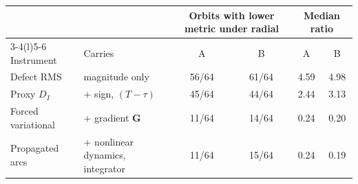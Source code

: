 \begin{tabular}{@{}l l cc cc@{}}
\toprule
 & & \multicolumn{2}{c}{Orbits with lower metric under radial} & \multicolumn{2}{c}{Median ratio} \\
\cmidrule(lr){3-4}\cmidrule(l){5-6}
Instrument & Carries & A & B & A & B \\
\midrule
Defect RMS & magnitude only & 56/64 & 61/64 & 4.59 & 4.98 \\
Proxy $D_I$ & $+$ sign, $(T-\tau)$ & 45/64 & 44/64 & 2.44 & 3.13 \\
Forced variational & $+$ gradient $\mathbf G$ & 11/64 & 14/64 & 0.24 & 0.20 \\
Propagated arcs & $+$ nonlinear dynamics, integrator & 11/64 & 15/64 & 0.24 & 0.19 \\
\bottomrule
\end{tabular}
